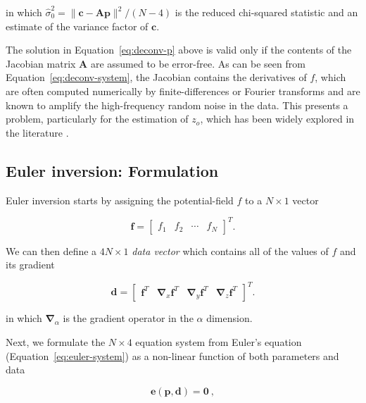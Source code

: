 \noindent
in which
${\hat{\sigma}_0^2} = \|\mathbf{c} - \mathbf{A}\mathbf{p}\|^2 / (N - 4)$
is the reduced chi-squared statistic and an estimate of the variance factor of
$\mathbf{c}$.

The solution in Equation~\ref{eq:deconv-p} above is valid only if the
contents of the Jacobian matrix $\mathbf{A}$ are assumed to be error-free.
As can be seen from Equation~\ref{eq:deconv-system}, the Jacobian contains the
derivatives of $f$, which are often computed numerically by finite-differences
or Fourier transforms and are known to amplify the high-frequency random noise
in the data.
This presents a problem, particularly for the estimation of $z_o$, which has
been widely explored in the literature
\citep{Silva2001,Melo2020,Pasteka2009,Florio2014}.


\subsection{Euler inversion: Formulation}

Euler inversion starts by assigning the potential-field $f$ to a $N \times 1$
vector

\begin{equation}
  \mathbf{f} =
  \begin{bmatrix}
    f_1 & f_2 & \cdots & f_N
  \end{bmatrix}^T.
\end{equation}

\noindent
We can then define a $4N \times 1$ \textit{data vector} which contains all of
the values of $f$ and its gradient

\begin{equation}
  \mathbf{d} =
  \begin{bmatrix}
    \mathbf{f}^T
    & \mathbf{\nabla}_x\mathbf{f}^T
    & \mathbf{\nabla}_y\mathbf{f}^T
    & \mathbf{\nabla}_z\mathbf{f}^T
  \end{bmatrix}^T.
  \label{eq:d}
\end{equation}

\noindent
in which $\mathbf{\nabla}_\alpha$ is the gradient operator in the $\alpha$
dimension.

Next, we formulate the $N \times 4$ equation system
from Euler's equation
(Equation~\ref{eq:euler-system})
as a non-linear function of both parameters and data

\begin{equation}
  \mathbf{e}(\mathbf{p}, \mathbf{d}) = \mathbf{0}
  \ ,
  \label{eq:e}
\end{equation}

